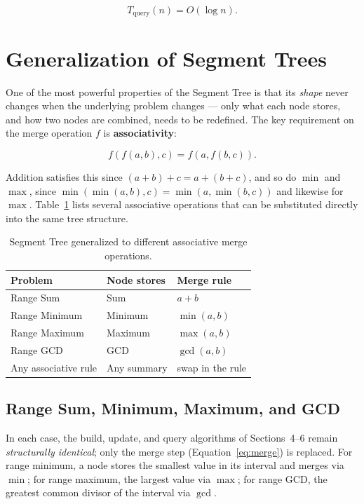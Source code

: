 \documentclass[11pt]{article}
\begin{document}
\begin{equation}
\boxed{T_{\text{query}}(n) = O(\log n)}.
\end{equation}

\section{Generalization of Segment Trees}
\label{sec:generalization}

One of the most powerful properties of the Segment Tree is that its \emph{shape} never changes when the underlying problem changes --- only what each node stores, and how two nodes are combined, needs to be redefined. The key requirement on the merge operation $f$ is \textbf{associativity}:

\begin{equation}
f(f(a,b),c) = f(a,f(b,c)).
\end{equation}

Addition satisfies this since $(a+b)+c = a+(b+c)$, and so do $\min$ and $\max$, since $\min(\min(a,b),c) = \min(a,\min(b,c))$ and likewise for $\max$. Table~\ref{tab:generalization} lists several associative operations that can be substituted directly into the same tree structure.

\begin{table}[h]
\centering
\caption{Segment Tree generalized to different associative merge operations.}
\label{tab:generalization}
\begin{tabular}{lll}
\toprule
\textbf{Problem} & \textbf{Node stores} & \textbf{Merge rule} \\
\midrule
Range Sum     & Sum         & $a+b$ \\
Range Minimum & Minimum     & $\min(a,b)$ \\
Range Maximum & Maximum     & $\max(a,b)$ \\
Range GCD     & GCD         & $\gcd(a,b)$ \\
\rowcolor{lightblue!30}
Any associative rule & Any summary & swap in the rule \\
\bottomrule
\end{tabular}
\end{table}

\subsection{Range Sum, Minimum, Maximum, and GCD}
In each case, the build, update, and query algorithms of Sections~4--6 remain \emph{structurally identical}; only the merge step (Equation~\eqref{eq:merge}) is replaced. For range minimum, a node stores the smallest value in its interval and merges via $\min$; for range maximum, the largest value via $\max$; for range GCD, the greatest common divisor of the interval via $\gcd$.
\end{document}

